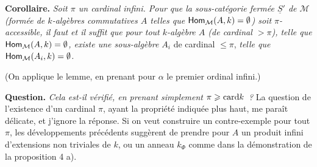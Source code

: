 
\noindent\textbf{Corollaire.} \textit{Soit $\pi$ un cardinal infini. Pour que la sous-catégorie fermée $\underline{S}'$ de $\mathcal{M}$ (formée de $k$-algèbres commutatives $A$ telles que $\mathsf{Hom}_{\mathcal{M}}(A,k)=\emptyset$) soit $\pi$-accessible, il faut et il suffit que pour tout $k$-algèbre $A$ (de cardinal ${}>\pi$), telle que $\mathsf{Hom}_{\mathcal{M}}(A,k)=\emptyset$, existe une sous-algèbre $A_i$} de cardinal $\leqslant\pi$, \textit{telle que $\mathsf{Hom}_{\mathcal{M}}(A_i,k)=\emptyset$.} %

\noindent(On applique le lemme, en prenant pour $\alpha$ le premier ordinal infini.)

\noindent\textbf{Question.} \textit{Cela est-il vérifié, en prenant simplement $\pi\geqslant\mathrm{card} k$~?} La question de l'existence d'un cardinal $\pi$, ayant la propriété indiquée plus haut, me paraît délicate, et j'ignore la réponse. Si on veut construire un contre-exemple pour tout $\pi$, les développements précédents suggèrent de prendre pour $A$ un produit infini d'extensions non triviales de $k$, ou un anneau $k_{\Phi}$ comme dans la démonstration de la proposition 4 a).


